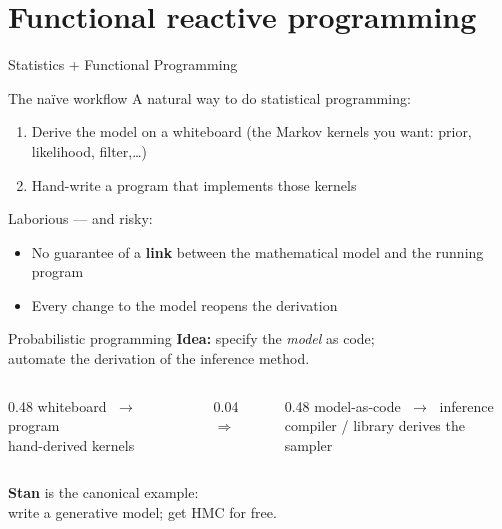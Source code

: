 \section{Functional reactive programming}
\renewcommand{\currentEdge}{stats-fp}

\begin{frame}{Statistics + Functional Programming}
  \begin{center}
  \end{center}
\end{frame}

\begin{frame}{The na\"ive workflow}
  A natural way to do statistical programming:
  \begin{enumerate}\setlength\itemsep{0.4em}
    \item Derive the model on a whiteboard
      (the Markov kernels you want: prior, likelihood, filter,\ldots)
    \item Hand-write a program that implements those kernels
  \end{enumerate}
  \vspace{0.6em}
  Laborious --- and risky:
  \begin{itemize}\setlength\itemsep{0.3em}
    \item No guarantee of a \textbf{link} between the mathematical model
      and the running program
    \item Every change to the model reopens the derivation
  \end{itemize}
\end{frame}

\begin{frame}{Probabilistic programming}
  \textbf{Idea:} specify the \emph{model} as code;\\
  automate the derivation of the inference method.
  \vspace{0.8em}
  \begin{columns}[c]
    \begin{column}{0.48\textwidth}
      \centering
      {\large whiteboard $\;\to\;$ program}\\[0.4em]
      {\small hand-derived kernels}
    \end{column}
    \begin{column}{0.04\textwidth}
      \centering$\Longrightarrow$
    \end{column}
    \begin{column}{0.48\textwidth}
      \centering
      {\large model-as-code $\;\to\;$ inference}\\[0.4em]
      {\small compiler / library derives the sampler}
    \end{column}
  \end{columns}
  \vspace{1em}
  \textbf{Stan} is the canonical example:\\
  write a generative model; get HMC for free.
\end{frame}

